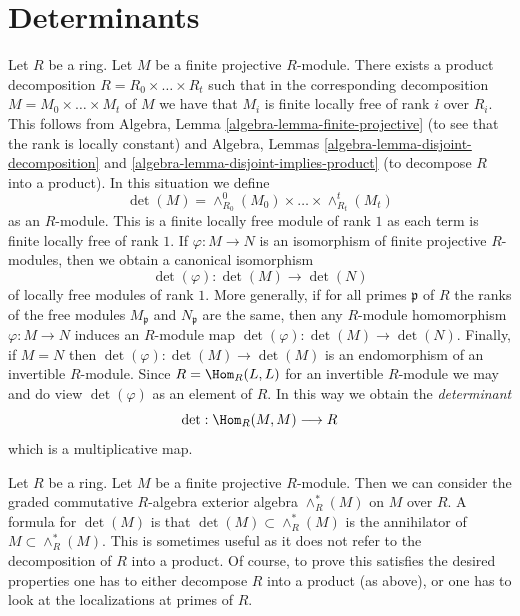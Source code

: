 \section{Determinants}
\label{section-determinants}

\noindent
Let $R$ be a ring. Let $M$ be a finite projective $R$-module.
There exists a product decomposition $R = R_0 \times \ldots \times R_t$
such that in the corresponding decomposition $M = M_0 \times \ldots \times M_t$
of $M$ we have that $M_i$ is finite locally free of rank $i$ over $R_i$.
This follows from Algebra, Lemma \ref{algebra-lemma-finite-projective}
(to see that the rank is locally constant) and
Algebra, Lemmas \ref{algebra-lemma-disjoint-decomposition} and
\ref{algebra-lemma-disjoint-implies-product} (to decompose
$R$ into a product). In this situation we define
$$
\det(M) = \wedge^0_{R_0}(M_0) \times \ldots \times \wedge^t_{R_t}(M_t)
$$
as an $R$-module. This is a finite locally free module of rank $1$
as each term is finite locally free of rank $1$.
If $\varphi : M \to N$ is an isomorphism of finite projective
$R$-modules, then we obtain a canonical isomorphism
$$
\det(\varphi) : \det(M) \longrightarrow \det(N)
$$
of locally free modules of rank $1$. More generally, if
for all primes $\mathfrak p$ of $R$ the ranks of the free modules
$M_\mathfrak p$ and $N_\mathfrak p$ are the same, then any $R$-module
homomorphism $\varphi : M \to N$ induces an $R$-module map
$\det(\varphi) : \det(M) \to \det(N)$. Finally, if $M = N$
then $\det(\varphi) : \det(M) \to \det(M)$ is an endomorphism
of an invertible $R$-module. Since $R = \Hom_R(L, L)$
for an invertible $R$-module we may and do view $\det(\varphi)$
as an element of $R$. In this way we obtain the {\it determinant}
$$
\det : \Hom_R(M, M) \longrightarrow R
$$
which is a multiplicative map.

\begin{remark}
\label{remark-determinant-as-socle}
Let $R$ be a ring. Let $M$ be a finite projective $R$-module.
Then we can consider the graded commutative $R$-algebra
exterior algebra $\wedge^*_R(M)$ on $M$ over $R$.
A formula for $\det(M)$ is that $\det(M) \subset \wedge^*_R(M)$
is the annihilator of $M \subset \wedge^*_R(M)$.
This is sometimes useful as it does not refer to the
decomposition of $R$ into a product. Of course, to
prove this satisfies the desired properties one has to
either decompose $R$ into a product (as above), or one
has to look at the localizations at primes of $R$.
\end{remark}

